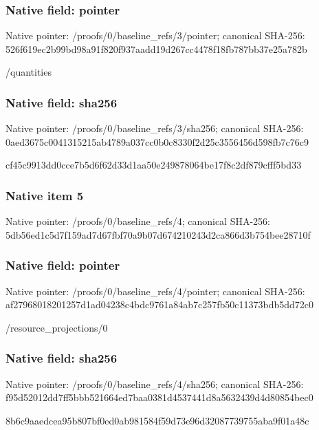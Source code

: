 \documentclass[10pt,a4paper]{article}
\begin{document}
\subsubsection{Native field: pointer}
Native pointer: /proofs/0/baseline\_\allowbreak{}refs/3/pointer; canonical SHA-256: 526f619ec2b99bd98a91f820f937aadd19d267cc4478f18fb787bb37e25a782b

\begingroup\raggedright\sloppy /\allowbreak{}quantities\par\endgroup

\subsubsection{Native field: sha256}
Native pointer: /proofs/0/baseline\_\allowbreak{}refs/3/sha256; canonical SHA-256: 0aed3675c0041315215ab4789a037cc0b0c8330f2d25c3556456d598fb7c76c9

\begingroup\raggedright\sloppy cf45c9913dd0cce7b5d6f62d33d1aa50e249878064be17f8c2df879cfff5bd33\par\endgroup

\subsubsection{Native item 5}
Native pointer: /proofs/0/baseline\_\allowbreak{}refs/4; canonical SHA-256: 5db56ed1c5d7f159ad7d67fbf70a9b07d674210243d2ca866d3b754bee28710f

\subsubsection{Native field: pointer}
Native pointer: /proofs/0/baseline\_\allowbreak{}refs/4/pointer; canonical SHA-256: af27968018201257d1ad04238c4bdc9761a84ab7c257fb50c11373bdb5dd72c0

\begingroup\raggedright\sloppy /\allowbreak{}resource\_\allowbreak{}projections/\allowbreak{}0\par\endgroup

\subsubsection{Native field: sha256}
Native pointer: /proofs/0/baseline\_\allowbreak{}refs/4/sha256; canonical SHA-256: f95d52012dd7ff5bbb521664ed7baa0381d4537441d8a5632439d4d80854bec0

\begingroup\raggedright\sloppy 8b6c9aaedcea95b807bf0ed0ab981584f59d73e96d32087739755aba9f01a48c\par\endgroup
\end{document}
